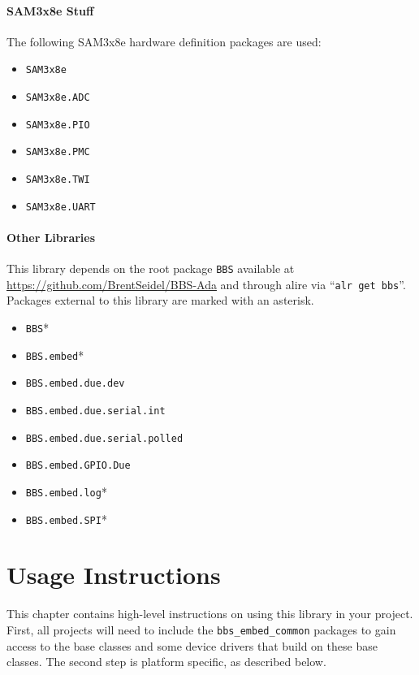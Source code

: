 \documentclass[10pt, openany]{book}
\newcommand{\package}[1]{\texttt{#1}}
\newcommand{\keyword}[1]{\texttt{#1}}
\begin{document}
\subsubsection{SAM3x8e Stuff}
The following SAM3x8e hardware definition packages are used:
\begin{itemize}
  \item \package{SAM3x8e}
  \item \package{SAM3x8e.ADC}
  \item \package{SAM3x8e.PIO}
  \item \package{SAM3x8e.PMC}
  \item \package{SAM3x8e.TWI}
  \item \package{SAM3x8e.UART}
\end{itemize}
\subsubsection{Other Libraries}
This library depends on the root package \package{BBS} available at \url{https://github.com/BrentSeidel/BBS-Ada} and through alire via ``\keyword{alr get bbs}''.  Packages external to this library are marked with an asterisk.
\begin{itemize}
  \item \package{BBS}*
  \item \package{BBS.embed}*
  \item \package{BBS.embed.due.dev}
  \item \package{BBS.embed.due.serial.int}
  \item \package{BBS.embed.due.serial.polled}
  \item \package{BBS.embed.GPIO.Due}
  \item \package{BBS.embed.log}*
  \item \package{BBS.embed.SPI}*
\end{itemize}


\chapter{Usage Instructions}
This chapter contains high-level instructions on using this library in your project.  First, all projects will need to include the \package{bbs\_embed\_common} packages to gain access to the base classes and some device drivers that build on these base classes.  The second step is platform specific, as described below.

\end{document}
